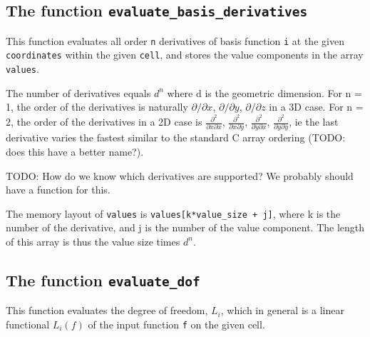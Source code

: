 
\subsection{The function \texttt{evaluate\_basis\_derivatives}}
This function evaluates all order \texttt{n} derivatives of basis function \texttt{i}
at the given \texttt{coordinates} within the given \texttt{cell},
and stores the value components in the array \texttt{values}.

The number of derivatives equals $d^n$ where d is the geometric dimension.
For n = 1, the order of the derivatives is naturally
$\partial/\partial x$, $\partial/\partial y$, $\partial/\partial z$
in a 3D case.
For n = 2, the order of the derivatives in a 2D case is 
  $\frac{\partial^2}{\partial x\partial x}$,
  $\frac{\partial^2}{\partial x\partial y}$,
  $\frac{\partial^2}{\partial y\partial x}$,
  $\frac{\partial^2}{\partial y\partial y}$,
ie the last derivative varies the fastest similar to the standard C array ordering (TODO: does this have a better name?).

TODO: How do we know which derivatives are supported? We probably should have a function for this.

The memory layout of \texttt{values} is
\texttt{values[k*value\_size + j]},
where k is the number of the derivative,
and j is the number of the value component.
The length of this array is thus the value size times $d^n$.



\subsection{The function \texttt{evaluate\_dof}}
This function evaluates the degree of freedom, $L_i$,  
which in general is a linear functional 
$L_i(f)$ of the input function \texttt{f}
on the given cell. 
  
